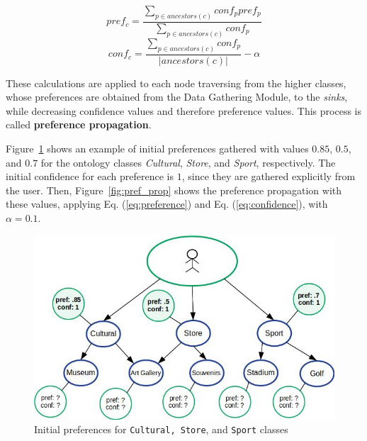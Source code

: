 \begin{equation} \label{eq:preference}
    pref_c = \frac{\displaystyle \sum_{p \in ancestors(c)}{conf_p pref_p}}
    {\displaystyle  \sum_{p \in ancestors(c)} {conf_p}}
\end{equation}
\begin{equation} \label{eq:confidence}
    conf_c = \frac{\displaystyle \sum_{p \in ancestors(c)} {conf_p}}{|ancestors(c)|} - \alpha
\end{equation}

These calculations are applied to each node traversing from the higher classes, whose preferences are obtained from the Data Gathering Module, to the \textit{sinks}, while decreasing confidence values and therefore preference values. 
This process is called \textbf{preference propagation}. 

Figure~\ref{fig:initial_pref} shows an example of initial preferences gathered with values $0.85$, $0.5$, and $0.7$ for the 
ontology classes \textit{Cultural}, \textit{Store}, and \textit{Sport}, respectively. The initial confidence for each preference is $1$, since they are gathered explicitly from the user. Then, Figure~\ref{fig:pref_prop} shows the preference propagation with these values, applying Eq. (\ref{eq:preference}) and Eq. (\ref{eq:confidence}), with $\alpha = 0.1$.

\begin{figure}[h]
\centering
\includegraphics[scale=0.5]{draws/initial_pref.jpg}
\caption{Initial preferences for {\tt Cultural, Store}, and {\tt Sport} classes}
\label{fig:initial_pref}
\end{figure}

